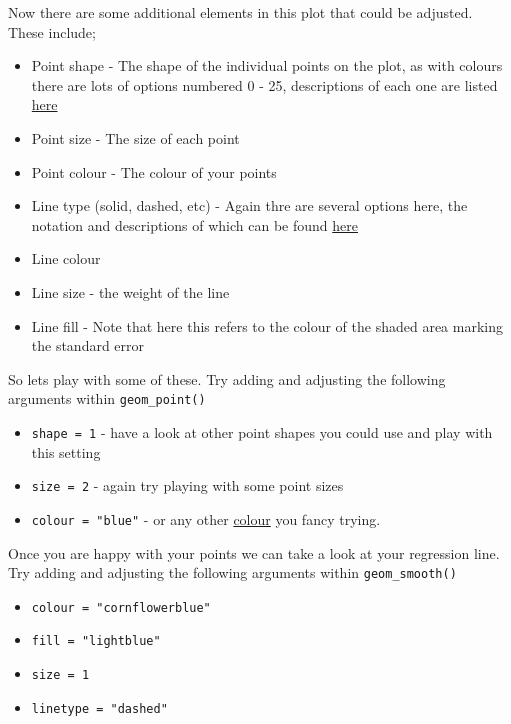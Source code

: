 \documentclass[
]{book}
\providecommand{\tightlist}{%
  \setlength{\itemsep}{0pt}\setlength{\parskip}{0pt}}
\begin{document}
Now there are some additional elements in this plot that could be adjusted. These include;

\begin{itemize}
\tightlist
\item
  Point shape - The shape of the individual points on the plot, as with colours there are lots of options numbered 0 - 25, descriptions of each one are listed \href{https://www.datanovia.com/en/blog/ggplot-point-shapes-best-tips/}{here}
\item
  Point size - The size of each point
\item
  Point colour - The colour of your points
\item
  Line type (solid, dashed, etc) - Again thre are several options here, the notation and descriptions of which can be found \href{http://www.sthda.com/english/wiki/ggplot2-line-types-how-to-change-line-types-of-a-graph-in-r-software}{here}
\item
  Line colour
\item
  Line size - the weight of the line
\item
  Line fill - Note that here this refers to the colour of the shaded area marking the standard error
\end{itemize}

So lets play with some of these. Try adding and adjusting the following arguments within \texttt{geom\_point()}

\begin{itemize}
\tightlist
\item
  \texttt{shape\ =\ 1} - have a look at other point shapes you could use and play with this setting
\item
  \texttt{size\ =\ 2} - again try playing with some point sizes
\item
  \texttt{colour\ =\ "blue"} - or any other \href{https://www.datanovia.com/en/blog/awesome-list-of-657-r-color-names/}{colour} you fancy trying.
\end{itemize}

Once you are happy with your points we can take a look at your regression line. Try adding and adjusting the following arguments within \texttt{geom\_smooth()}

\begin{itemize}
\tightlist
\item
  \texttt{colour\ =\ "cornflowerblue"}
\item
  \texttt{fill\ =\ "lightblue"}
\item
  \texttt{size\ =\ 1}
\item
  \texttt{linetype\ =\ "dashed"}
\end{itemize}
\end{document}
